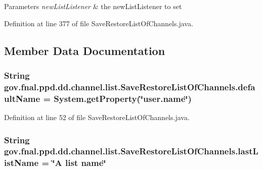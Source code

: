 \begin{DoxyParams}{Parameters}
{\em new\-List\-Listener} & the new\-List\-Listener to set \\
\hline
\end{DoxyParams}


Definition at line 377 of file Save\-Restore\-List\-Of\-Channels.\-java.



\subsection{Member Data Documentation}
\hypertarget{classgov_1_1fnal_1_1ppd_1_1dd_1_1channel_1_1list_1_1SaveRestoreListOfChannels_a53fc1fa910b3fdb6367bb2131e0101d2}{
\subsubsection[{default\-Name}]{\setlength{\rightskip}{0pt plus 5cm}String gov.\-fnal.\-ppd.\-dd.\-channel.\-list.\-Save\-Restore\-List\-Of\-Channels.\-default\-Name = System.\-get\-Property(\char`\"{}user.\-name\char`\"{})\hspace{0.3cm}{\ttfamily [protected]}}}\label{classgov_1_1fnal_1_1ppd_1_1dd_1_1channel_1_1list_1_1SaveRestoreListOfChannels_a53fc1fa910b3fdb6367bb2131e0101d2}


Definition at line 52 of file Save\-Restore\-List\-Of\-Channels.\-java.

\hypertarget{classgov_1_1fnal_1_1ppd_1_1dd_1_1channel_1_1list_1_1SaveRestoreListOfChannels_ab7af798b223d81bf88344bd4691d44c0}{
\subsubsection[{last\-List\-Name}]{\setlength{\rightskip}{0pt plus 5cm}String gov.\-fnal.\-ppd.\-dd.\-channel.\-list.\-Save\-Restore\-List\-Of\-Channels.\-last\-List\-Name = \char`\"{}A list name\char`\"{}\hspace{0.3cm}{\ttfamily [protected]}}}\label{classgov_1_1fnal_1_1ppd_1_1dd_1_1channel_1_1list_1_1SaveRestoreListOfChannels_ab7af798b223d81bf88344bd4691d44c0}


